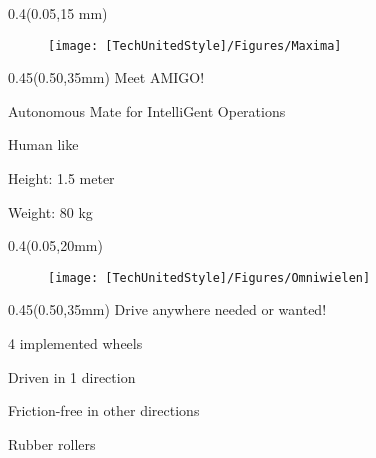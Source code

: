 \documentclass[aspectratio=43]{beamer}
\newcommand{\TULeftMargin}{0.05\paperwidth}
\newcommand{\TULeftWidth}{0.4\paperwidth}
\newcommand{\TURightMargin}{0.50\paperwidth}
\newcommand{\TURightWidth}{0.45\paperwidth}
\begin{document}
	\begin{frame}
	
		\begin{textblock*}{\TULeftWidth}(\TULeftMargin,15	mm)
			\begin{figure}
				\centering
\texttt{[image: [TechUnitedStyle]/Figures/Maxima]}
			\end{figure}
		\end{textblock*}
		
		\begin{textblock*}{\TURightWidth}(\TURightMargin,35mm)
			Meet AMIGO!
			\begin{TechUnitedItems}
				\item Autonomous Mate for IntelliGent Operations
				\item Human like
				\item Height: 1.5 meter
				\item Weight: 80 kg
			
			\end{TechUnitedItems}
			
	\end{textblock*}
	
	\end{frame}


\begin{frame}
	\end{frame}	
	
%



	\begin{frame}
	
		\begin{textblock*}{\TULeftWidth}(\TULeftMargin,20mm)
			\begin{figure}
				\centering
				\texttt{[image: [TechUnitedStyle]/Figures/Omniwielen]}
			\end{figure}
		\end{textblock*}
		
		\begin{textblock*}{\TURightWidth}(\TURightMargin,35mm)
			 Drive anywhere needed or wanted!
			\begin{TechUnitedItems}
				\item 4 implemented wheels
				\item Driven in 1 direction
				\item Friction-free in other directions
				\item Rubber rollers	
			
			\end{TechUnitedItems}
			
	\end{textblock*}
	
	\end{frame}
	
\end{document}
